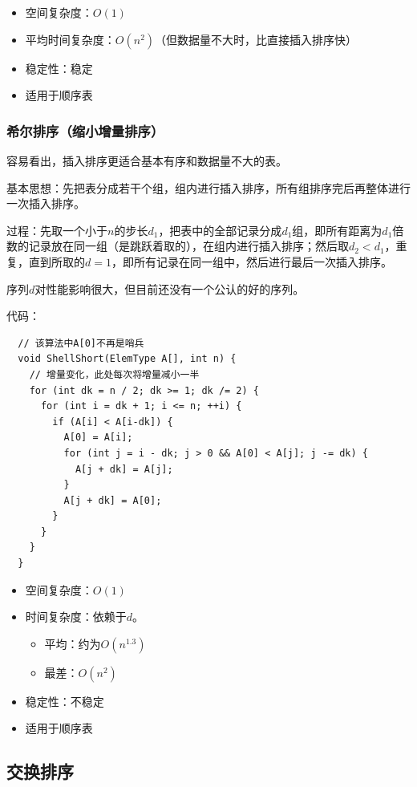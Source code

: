 \documentclass[12pt, a4paper, oneside]{ctexart}
\begin{document}
\begin{itemize}
  \item 空间复杂度：$O(1)$
  \item 平均时间复杂度：$O(n^2)$（但数据量不大时，比直接插入排序快）
  \item 稳定性：稳定
  \item 适用于顺序表
\end{itemize}

\subsubsection{希尔排序（缩小增量排序）}

容易看出，插入排序更适合基本有序和数据量不大的表。

基本思想：先把表分成若干个组，组内进行插入排序，所有组排序完后再整体进行一次插入排序。

过程：先取一个小于$n$的步长$d_1$，把表中的全部记录分成$d_1$组，即所有距离为$d_1$倍数的记录放在同一组（是跳跃着取的），在组内进行插入排序；然后取$d_2<d_1$，重复，直到所取的$d=1$，即所有记录在同一组中，然后进行最后一次插入排序。

序列$d$对性能影响很大，但目前还没有一个公认的好的序列。

代码：
\begin{lstlisting}
  // 该算法中A[0]不再是哨兵
  void ShellShort(ElemType A[], int n) {
    // 增量变化，此处每次将增量减小一半
    for (int dk = n / 2; dk >= 1; dk /= 2) {
      for (int i = dk + 1; i <= n; ++i) {
        if (A[i] < A[i-dk]) {
          A[0] = A[i];
          for (int j = i - dk; j > 0 && A[0] < A[j]; j -= dk) {
            A[j + dk] = A[j];
          }
          A[j + dk] = A[0];
        }
      }
    }
  }
\end{lstlisting}

\begin{itemize}
  \item 空间复杂度：$O(1)$
  \item 时间复杂度：依赖于$d$。
  \begin{itemize}
    \item 平均：约为$O(n^{1.3})$
    \item 最差：$O(n^2)$
  \end{itemize}
  \item 稳定性：不稳定
  \item 适用于顺序表
\end{itemize}

\subsection{交换排序}
\end{document}
